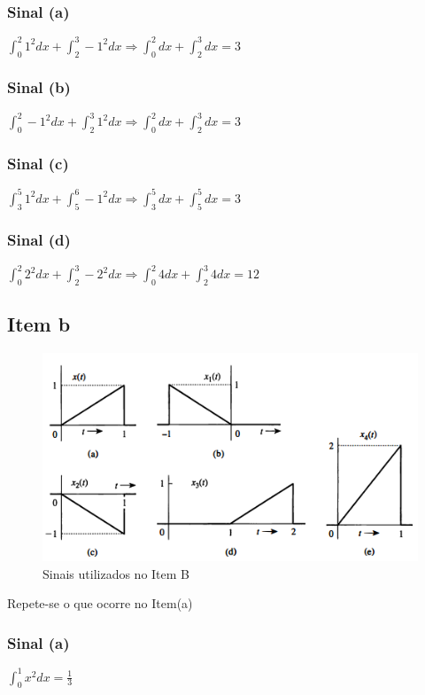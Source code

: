 \documentclass[a4paper, 12pt]{article}
\begin{document}
            \subsubsection{Sinal (a)}
            $\int_{0}^{2} 1^{2}dx + \int_{2}^{3} -1^{2}dx \Rightarrow  \int_{0}^{2}dx + \int_{2}^{3}dx = 3$
            \subsubsection{Sinal (b)}
            $\int_{0}^{2} -1^{2}dx + \int_{2}^{3} 1^{2}dx \Rightarrow  \int_{0}^{2}dx + \int_{2}^{3}dx = 3$
            \subsubsection{Sinal (c)}
            $\int_{3}^{5} 1^{2}dx + \int_{5}^{6} -1^{2}dx \Rightarrow  \int_{3}^{5}dx + \int_{5}^{5}dx = 3$
            \subsubsection{Sinal (d)}
            $\int_{0}^{2} 2^{2}dx + \int_{2}^{3} -2^{2}dx \Rightarrow  \int_{0}^{2}4dx + \int_{2}^{3}4dx = 12$
            \newpage
        \subsection{Item b}
            \begin{figure}[!ht]
                \centering
                \includegraphics{img/Figura2.PNG}
                \caption{Sinais utilizados no Item B}
            \end{figure}
            Repete-se o que ocorre no Item(a)
            \subsubsection{Sinal (a)}
            $\int_{0}^{1} x^{2}dx  = \frac{1}{3}$
\end{document}
